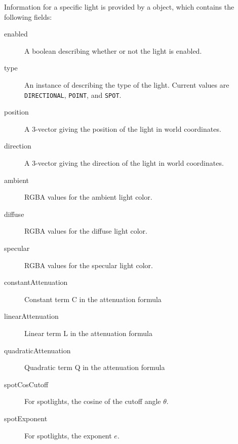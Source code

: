 Information for a specific light is provided by a
 object, which contains the following
fields:

\begin{description}

\item[enabled]\mbox{}

A boolean describing whether or not the light is enabled.

\item[type]\mbox{}

An instance of 
describing the type of the light. Current values are
{\tt DIRECTIONAL}, {\tt POINT}, and {\tt SPOT}.

\item[position]\mbox{}

A 3-vector giving the position of the light in world coordinates.

\item[direction]\mbox{}

A 3-vector giving the direction of the light in world coordinates.

\item[ambient]\mbox{}

RGBA values for the ambient light color.

\item[diffuse]\mbox{}

RGBA values for the diffuse light color.

\item[specular]\mbox{}

RGBA values for the specular light color.

\item[constantAttenuation]\mbox{}

Constant term C in the attenuation formula

\item[linearAttenuation]\mbox{}

Linear term L in the attenuation formula

\item[quadraticAttenuation]\mbox{}

Quadratic term Q in the attenuation formula

\item[spotCosCutoff]\mbox{}

For spotlights, the cosine of the cutoff angle $\theta$.

\item[spotExponent]\mbox{}

For spotlights, the exponent $e$.

\end{description}

